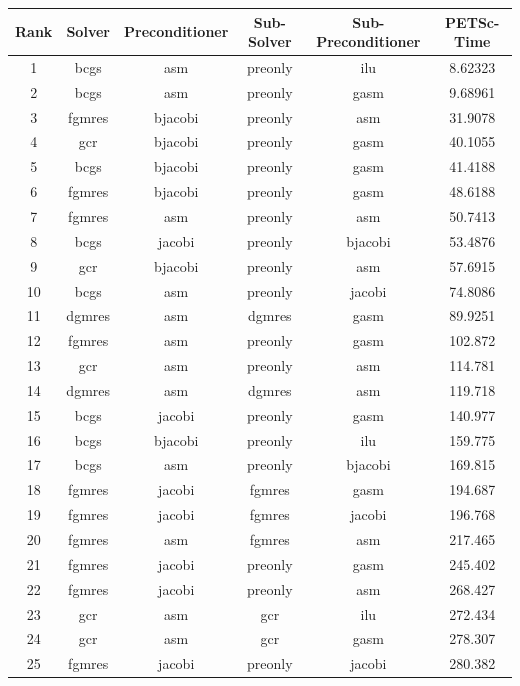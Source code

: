 \begin{table}[h]
  \tiny
  \centering
  \begin{tabular}{cccccc}
    \hline Rank & Solver & Preconditioner & Sub-Solver & Sub-Preconditioner & PETSc-Time\\ \hline

    1 & bcgs & asm & preonly & ilu & 8.62323 \\
    2 & bcgs & asm & preonly & gasm & 9.68961 \\
    3 & fgmres & bjacobi & preonly & asm & 31.9078 \\
    4 & gcr & bjacobi & preonly & gasm & 40.1055 \\
    5 & bcgs & bjacobi & preonly & gasm & 41.4188 \\
    6 & fgmres & bjacobi & preonly & gasm & 48.6188 \\
    7 & fgmres & asm & preonly & asm & 50.7413 \\
    8 & bcgs & jacobi & preonly & bjacobi & 53.4876 \\
    9 & gcr & bjacobi & preonly & asm & 57.6915 \\
    10 & bcgs & asm & preonly & jacobi & 74.8086 \\
    11 & dgmres & asm & dgmres & gasm & 89.9251 \\
    12 & fgmres & asm & preonly & gasm & 102.872 \\
    13 & gcr & asm & preonly & asm & 114.781 \\
    14 & dgmres & asm & dgmres & asm & 119.718 \\
    15 & bcgs & jacobi & preonly & gasm & 140.977 \\
    16 & bcgs & bjacobi & preonly & ilu & 159.775 \\
    17 & bcgs & asm & preonly & bjacobi & 169.815 \\
    18 & fgmres & jacobi & fgmres & gasm & 194.687 \\
    19 & fgmres & jacobi & fgmres & jacobi & 196.768 \\
    20 & fgmres & asm & fgmres & asm & 217.465 \\
    21 & fgmres & jacobi & preonly & gasm & 245.402 \\
    22 & fgmres & jacobi & preonly & asm & 268.427 \\
    23 & gcr & asm & gcr & ilu & 272.434 \\
    24 & gcr & asm & gcr & gasm & 278.307 \\
    25 & fgmres & jacobi & preonly & jacobi & 280.382 \\

\end{tabular}
\end{table}
